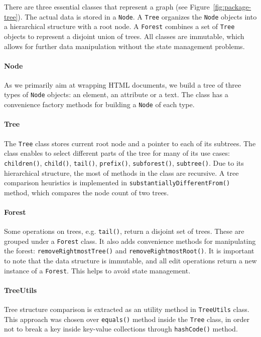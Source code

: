 There are three essential classes that represent a graph (see Figure~\ref{fig:package-tree}). The actual data is stored in a \texttt{Node}. A \texttt{Tree} organizes the \texttt{Node} objects into a hierarchical structure with a root node. A \texttt{Forest} combines a set of \texttt{Tree} objects to represent a disjoint union of trees. All classes are immutable, which allows for further data manipulation without the state management problems.


\paragraph{Node} As we primarily aim at wrapping HTML documents, we build a tree of three types of \texttt{Node} objects: an element, an attribute or a text. The class has a convenience factory methods for building a \texttt{Node} of each type.

\paragraph{Tree} The \texttt{Tree} class stores current root node and a pointer to each of its subtrees. The class enables to select different parts of the tree for many of its use cases: \texttt{children()}, \texttt{child()}, \texttt{tail()}, \texttt{prefix()}, \texttt{subforest()}, \texttt{subtree()}. Due to its hierarchical structure, the most of methods in the class are recursive. A tree comparison heuristics is implemented in \texttt{substantiallyDifferentFrom()} method, which compares the node count of two trees.

\paragraph{Forest} Some operations on trees, e.g. \texttt{tail()}, return a disjoint set of trees. These are grouped under a \texttt{Forest} class. It also adds convenience methods for manipulating the forest: \texttt{removeRightmostTree()} and \texttt{removeRightmostRoot()}. It is important to note that the data structure is immutable, and all edit operations return a new instance of a \texttt{Forest}. This helps to avoid state management.

\paragraph{TreeUtils} Tree structure comparison is extracted as an utility method in \texttt{TreeUtils} class. This approach was chosen over \texttt{equals()} method inside the \texttt{Tree} class, in order not to break a key inside key-value collections through \texttt{hashCode()} method.

